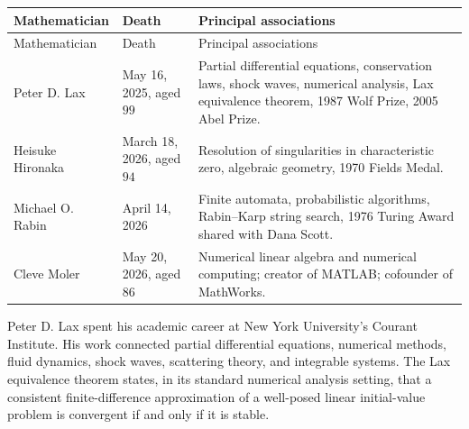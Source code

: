     \vspace{1em}

    {\small
    \renewcommand{\arraystretch}{1.18}
    \begin{longtable}{@{}L{0.21\textwidth}L{0.18\textwidth}L{0.45\textwidth}@{}}
        \toprule
        Mathematician & Death & Principal associations \\
        \midrule
        \endfirsthead

        \toprule
        Mathematician & Death & Principal associations \\
        \midrule
        \endhead

        \bottomrule
        \endlastfoot

        Peter D. Lax
        & May 16, 2025, aged $99$
        & Partial differential equations, conservation laws, shock waves,
          numerical analysis, Lax equivalence theorem, 1987 Wolf Prize, 2005 Abel Prize. \\

        Heisuke Hironaka
        & March 18, 2026, aged $94$
        & Resolution of singularities in characteristic zero, algebraic geometry,
          1970 Fields Medal. \\

        Michael O. Rabin
        & April 14, 2026
        & Finite automata, probabilistic algorithms, Rabin--Karp string search,
          1976 Turing Award shared with Dana Scott. \\

        Cleve Moler
        & May 20, 2026, aged $86$
        & Numerical linear algebra and numerical computing; creator of MATLAB;
          cofounder of MathWorks. \\
    \end{longtable}
    }

    \begin{fact}
        \par\noindent
        Peter D. Lax spent his academic career at New York University's Courant
        Institute. His work connected partial differential equations, numerical
        methods, fluid dynamics, shock waves, scattering theory, and integrable
        systems. The Lax equivalence theorem states, in its standard numerical
        analysis setting, that a consistent finite-difference approximation of
        a well-posed linear initial-value problem is convergent if and only if it
        is stable.
    \end{fact}


